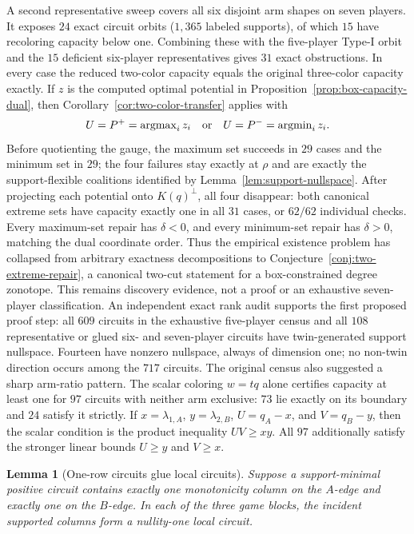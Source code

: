 \documentclass[11pt]{article}
\newtheorem{lemma}[theorem]{Lemma}
\begin{document}
A second representative sweep covers all six disjoint arm shapes on seven
players. It exposes $24$ exact circuit orbits ($1{,}365$ labeled supports),
of which $15$ have recoloring capacity below one. Combining these with the
five-player Type-I orbit and the $15$ deficient six-player representatives
gives $31$ exact obstructions. In every case the reduced two-color capacity
equals the original three-color capacity exactly. If $z$ is the computed
optimal potential in Proposition~\ref{prop:box-capacity-dual}, then
Corollary~\ref{cor:two-color-transfer} applies with
\[
 U=P^+=\operatorname{argmax}_i z_i
 \quad\hbox{or}\quad
 U=P^-=\operatorname{argmin}_i z_i.
\]
Before quotienting the gauge, the maximum set succeeds in $29$ cases and the
minimum set in $29$; the four failures stay exactly at $\rho$ and are exactly
the support-flexible coalitions identified by
Lemma~\ref{lem:support-nullspace}. After projecting each potential onto
$K(q)^\perp$, all four disappear: both canonical extreme sets have capacity
exactly one in all $31$ cases, or $62/62$ individual checks. Every maximum-set
repair has $\delta<0$, and every minimum-set repair has $\delta>0$, matching
the dual coordinate order. Thus the
empirical existence problem has collapsed from arbitrary exactness
decompositions to Conjecture~\ref{conj:two-extreme-repair}, a canonical
two-cut statement for a box-constrained degree zonotope. This remains
discovery evidence, not a proof or an exhaustive seven-player classification.
An independent exact rank audit supports the first proposed proof step:
all $609$ circuits in the exhaustive five-player census and all $108$
representative or glued six- and seven-player circuits have twin-generated
support nullspace. Fourteen have nonzero nullspace, always of dimension one;
no non-twin direction occurs among the $717$ circuits.
The original census also suggested a sharp arm-ratio pattern.  The scalar
coloring $w=tq$ alone certifies capacity at least one for $97$ circuits with
neither arm exclusive: $73$ lie exactly on its boundary and $24$ satisfy it
strictly.  If $x=\lambda_{1,A}$, $y=\lambda_{2,B}$,
$U=q_A-x$, and $V=q_B-y$, then the scalar condition is the product inequality
$UV\geq xy$.  All $97$ additionally satisfy the stronger linear bounds
$U\geq y$ and $V\geq x$.

\begin{lemma}[One-row circuits glue local circuits]
\label{lem:local-circuit-gluing}
Suppose a support-minimal positive circuit contains exactly one
monotonicity column on the $A$-edge and exactly one on the $B$-edge.  In
each of the three game blocks, the incident supported columns form a
nullity-one local circuit.
\end{lemma}
\end{document}
